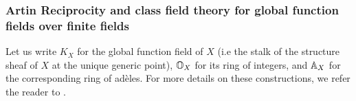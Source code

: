         \subsubsection{Artin Reciprocity and class field theory for global function fields over finite fields}
            \begin{convention} \label{conv: global_function_field}
                Let us write $K_X$ for the global function field of $X$ (i.e the stalk of the structure sheaf of $X$ at the unique generic point), $\mathbb{O}_X$ for its ring of integers, and $\mathbb{A}_X$ for the corresponding ring of ad\`eles. For more details on these constructions, we refer the reader to \cite[Section VI.1]{neukirch_2010_algebraic_number_theory}. 
            \end{convention}
            
